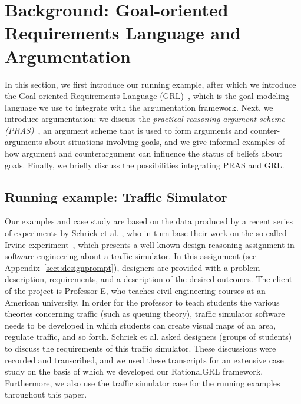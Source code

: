 \section{Background: Goal-oriented Requirements Language and Argumentation}
\label{sect:background}

In this section, we first introduce our running example, after which we introduce the Goal-oriented Requirements Language (GRL)~\cite{Amyot:2010:EGM:1841349.1841356}, which is the goal modeling language we use to integrate with the argumentation framework. Next, we introduce argumentation: we discuss the \emph{practical reasoning argument scheme (PRAS)}~\cite{atkinson2007}, an argument scheme that is used to form arguments and counter-arguments about situations involving goals, and we give informal examples of how argument and counterargument can influence the status of beliefs about goals. Finally, we briefly discuss the possibilities integrating PRAS and GRL.  %

\subsection{Running example: Traffic Simulator}
\label{sect:goals:runningexample}

Our examples and case study are based on the data produced by a recent series of experiments by Schriek et al. \cite{SchriekEtal2016}, who in turn base their work on the so-called Irvine experiment~\cite{UCIworkshop}, which presents a well-known design reasoning assignment in software engineering about a traffic simulator. In this assignment (see Appendix~\ref{sect:designprompt}), designers are provided with a problem description, requirements, and a description of the desired outcomes. The client of the project is Professor E, who teaches civil engineering courses at an American university. In order for the professor to teach students the various theories concerning traffic (such as queuing theory), traffic simulator software needs to be developed in which students can create visual maps of an area, regulate traffic, and so forth. Schriek et al. asked designers (groups of students) to discuss the requirements of this traffic simulator. These discussions were recorded and transcribed, and we used these transcripts for an extensive case study on the basis of which we developed our RationalGRL framework. Furthermore, we also use the traffic simulator case for the running examples throughout this paper. 

